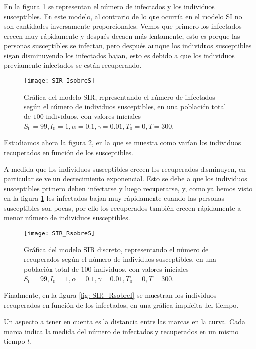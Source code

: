 En la figura \ref{fig: SIR_IsobreS} se representan el número de infectados y los individuos susceptibles. En este modelo, al contrario de lo que ocurría en el modelo SI no son cantidades inversamente proporcionales. Vemos que primero los infectados crecen muy rápidamente y después decaen más lentamente, esto es porque las personas susceptibles se infectan, pero después aunque los individuos susceptibles sigan disminuyendo los infectados bajan, esto es debido a que los individuos previamente infectados se están recuperando.

\begin{figure}
\begin{center}
\caption{Gráfica del modelo SIR, representando el número de infectados según el número de individuos susceptibles, en una población total de $100$ individuos, con valores iniciales $S_0=99, I_0 = 1, \alpha = 0.1, \gamma=0.01, T_0 = 0, T = 300$.}
\label{fig: SIR_IsobreS}
\texttt{[image: SIR\_IsobreS]}
\end{center}
\end{figure}

Estudiamos ahora la figura \ref{fig: SIR_RsobreS}, en la que se muestra como varían los individuos recuperados en función de los susceptibles.

A medida que los individuos susceptibles crecen los recuperados disminuyen, en particular se ve un decrecimiento exponencial. Esto se debe a que los individuos susceptibles primero deben infectarse y luego recuperarse, y, como ya hemos visto en la figura \ref{fig: SIR_IsobreS} los infectados bajan muy rápidamente cuando las personas susceptibles son pocas, por ello los recuperados también crecen rápidamente a menor número de individuos susceptibles.

\begin{figure}
\begin{center}
\caption{Gráfica del modelo SIR discreto, representando el número de recuperados según el número de individuos susceptibles, en una población total de $100$ individuos, con valores iniciales $S_0=99, I_0 = 1, \alpha = 0.1, \gamma=0.01, T_0 = 0, T = 300$.}
\label{fig: SIR_RsobreS}
\texttt{[image: SIR\_RsobreS]}
\end{center}
\end{figure}

Finalmente, en la figura \ref{fig: SIR_RsobreI} se muestran los individuos recuperados en función de los infectados, en una gráfica implícita del tiempo.

Un aspecto a tener en cuenta es la distancia entre las marcas en la curva. Cada marca indica la medida del número de infectados y recuperados en un mismo tiempo $t$.

